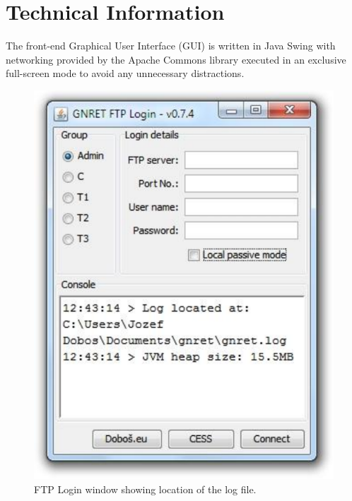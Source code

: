 \documentclass[a4paper,11pt,oneside]{article}
\begin{document}
	

\section{Technical Information}

The front-end Graphical User Interface (GUI) is written in Java Swing with networking provided by the Apache Commons library executed in an exclusive full-screen mode to avoid any unnecessary distractions.


\begin{figure}
\vspace{-28pt}
\begin{center}
  \includegraphics[width=\linewidth]{images/login.pdf}
  \caption{FTP Login window showing location of the log file.}
   \label{applab}  
  \end{center}  
  \vspace{-26pt}
\end{figure}
\end{document}
